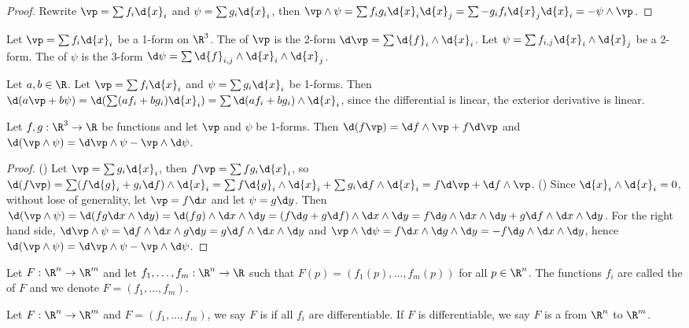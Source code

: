 \documentclass[10pt]{article}
\begin{document}
\begin{proof}
    Rewrite $\vp=\sum{f}_{i}\d{x}_{i}$ and $\psi=\sum{g}_{i}\d{x}_{i}$, then $\vp\wedge\psi=\sum{f}_{i}{g}_{i}\d{x}_{i}\d{x}_{j}=\sum-{g}_{i}{f}_{i}\d{x}_{j}\d{x}_{i}=-\psi\wedge\vp$.
\end{proof}
\begin{definition}
    Let $\vp=\sum{f}_{i}\d{x}_{i}$ be a 1-form on ${\R}^{3}$. The  of $\vp$ is the 2-form $\d\vp=\sum\d{f}_{i}\wedge\d{x}_{i}$. Let $\psi=\sum{f}_{i,j}\d{x}_{i}\wedge\d{x}_{j}$ be a 2-form. The  of $\psi$ is the 3-form $\d\psi=\sum\d{f}_{i,j}\wedge\d{x}_{i}\wedge\d{x}_{j}$. 
\end{definition}
\par
Let $a,b\in\R$. Let $\vp=\sum{f}_{i}\d{x}_{i}$ and $\psi=\sum{g}_{i}\d{x}_{i}$ be 1-forms. Then $\d(a\vp+b\psi)=\d(\sum(a{f}_{i}+b{g}_{i})\d{x}_{i})=\sum\d(a{f}_{i}+b{g}_{i})\wedge\d{x}_{i}$, since the differential is linear, the exterior derivative is linear.
\begin{proposition}
    Let $f,g:{\R}^{3}\to\R$ be functions and let $\vp$ and $\psi$ be 1-forms. Then $\d(f\vp)=\d f\wedge\vp+f\d\vp$ and $\d(\vp\wedge\psi)=\d\vp\wedge\psi-\vp\wedge\d\psi$.
\end{proposition}
\begin{proof}
    () Let $\vp=\sum{g}_{i}\d{x}_{i}$, then $f\vp=\sum f{g}_{i}\d{x}_{i}$, so $\d(f\vp)=\sum(f\d{g}_{i}+{g}_{i}\d f)\wedge\d{x}_{i}=\sum f\d{g}_{i}\wedge\d{x}_{i}+\sum{g}_{i}\d f\wedge\d{x}_{i}=f\d\vp+\d f\wedge\vp$. () Since $\d{x}_{i}\wedge\d{x}_{i}=0$, without lose of generality, let $\vp=f\d x$ and let $\psi=g\d y$. Then $\d(\vp\wedge\psi)=\d(fg\d x\wedge\d y)=\d(fg)\wedge\d x\wedge\d y=(f\d g+g\d f)\wedge\d x\wedge\d y=f\d g\wedge\d x\wedge\d y+g\d f\wedge\d x\wedge\d y$. For the right hand side, $\d\vp\wedge\psi=\d f\wedge\d x\wedge g\d y=g\d f\wedge\d x\wedge\d y$ and $\vp\wedge\d\psi=f\d x\wedge\d g\wedge\d y=-f\d g\wedge\d x\wedge\d y$, hence $\d(\vp\wedge\psi)=\d\vp\wedge\psi-\vp\wedge\d\psi$.
\end{proof}
\begin{definition}
    Let $F:{\R}^{n}\to{\R}^{m}$ and let ${f}_{1},\dots,{f}_{m}:{\R}^{n}\to\R$ such that $F(p)=({f}_{1}(p),\dots,{f}_{m}(p))$ for all $p\in{\R}^{n}$. The functions ${f}_{i}$ are called the  of $F$ and we denote $F=({f}_{1},\dots,{f}_{m})$.
\end{definition}
\begin{definition}
    Let $F:{\R}^{n}\to{\R}^{m}$ and $F=({f}_{1},\dots,{f}_{m})$, we say $F$ is  if all ${f}_{i}$ are differentiable. If $F$ is differentiable, we say $F$ is a  from ${\R}^{n}$ to ${\R}^{m}$.
\end{definition}
\end{document}
